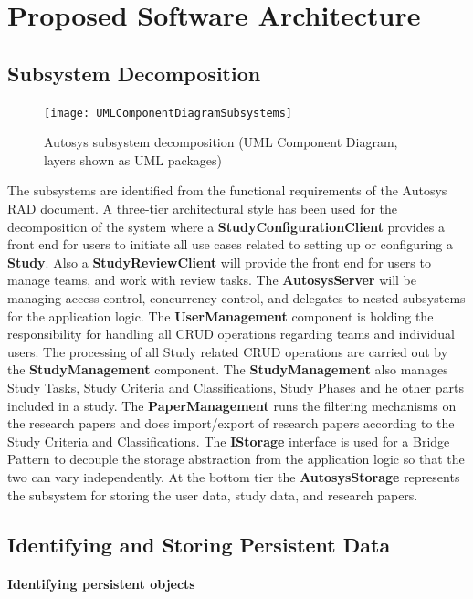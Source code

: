 \section{Proposed Software Architecture}
\subsection{Subsystem Decomposition}
\begin{figure}[H]
	\texttt{[image: UMLComponentDiagramSubsystems]}
	\caption{Autosys subsystem decomposition (UML Component Diagram, layers shown as UML packages)}
	\label{fig:Subsystem Decomposition, UML Component Diagram}
\end{figure}
The subsystems are identified from the functional requirements of the Autosys RAD document. A three-tier architectural style has been used for the decomposition of the system where a \textbf{StudyConfigurationClient} provides a front end for users to initiate all use cases related to setting up or configuring a \textbf{Study}. Also a \textbf{StudyReviewClient} will provide the front end for users to manage teams, and work with review tasks.
The \textbf{AutosysServer} will be managing access control, concurrency control, and delegates to nested subsystems for the application logic. The \textbf{UserManagement} component is holding the responsibility for handling all CRUD operations regarding teams and individual users. The processing of all Study related CRUD operations are carried out by the \textbf{StudyManagement} component. The  \textbf{StudyManagement} also manages Study Tasks, Study Criteria and Classifications, Study Phases and he other parts included in a study. The \textbf{PaperManagement} runs the filtering mechanisms on the research papers and does import/export of research papers according to the Study Criteria and Classifications.
The\textbf{ IStorage} interface is used for a Bridge Pattern to decouple the storage abstraction from the application logic so that the two can vary independently. At the bottom tier the \textbf{AutosysStorage} represents the subsystem for storing the user data, study data, and research papers.

\subsection{Identifying and Storing Persistent Data}
\paragraph{Identifying persistent objects}\mbox{}\\


